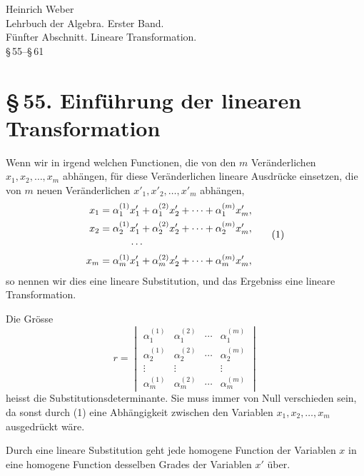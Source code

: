 \documentclass[11pt]{article}
\newcommand{\sect}[2]{\section*{\S\,#1. #2}}
\begin{document}
\begin{center}
{\large Heinrich Weber}\\[0.35em]
{\Large Lehrbuch der Algebra. Erster Band.}\\[0.35em]
{\large Fünfter Abschnitt. Lineare Transformation.}\\[0.25em]
{\large \S\,55--\S\,61}
\end{center}

\sect{55}{Einführung der linearen Transformation}

Wenn wir in irgend welchen Functionen, die von den $m$ Veränderlichen $x_1,x_2,\ldots,x_m$ abhängen, für diese Veränderlichen lineare Ausdrücke einsetzen, die von $m$ neuen Veränderlichen $x'_1,x'_2,\ldots,x'_m$ abhängen,
\begin{equation}
\begin{aligned}
 x_1&=\alpha_1^{(1)}x'_1+\alpha_1^{(2)}x'_2+\cdots+\alpha_1^{(m)}x'_m,\\
 x_2&=\alpha_2^{(1)}x'_1+\alpha_2^{(2)}x'_2+\cdots+\alpha_2^{(m)}x'_m,\\
 &\hspace{3.0em}\cdots\\
 x_m&=\alpha_m^{(1)}x'_1+\alpha_m^{(2)}x'_2+\cdots+\alpha_m^{(m)}x'_m,
\end{aligned}
\tag{1}
\end{equation}
so nennen wir dies eine lineare Substitution, und das Ergebniss eine lineare Transformation.

Die Grösse
\begin{equation}
 r=\begin{vmatrix}
 \alpha_1^{(1)}&\alpha_1^{(2)}&\cdots&\alpha_1^{(m)}\\
 \alpha_2^{(1)}&\alpha_2^{(2)}&\cdots&\alpha_2^{(m)}\\
 \vdots&\vdots&&\vdots\\
 \alpha_m^{(1)}&\alpha_m^{(2)}&\cdots&\alpha_m^{(m)}
 \end{vmatrix}
\tag{2}
\end{equation}
heisst die Substitutionsdeterminante. Sie muss immer von Null verschieden sein, da sonst durch (1) eine Abhängigkeit zwischen den Variablen $x_1,x_2,\ldots,x_m$ ausgedrückt wäre.

Durch eine lineare Substitution geht jede homogene Function der Variablen $x$ in eine homogene Function desselben Grades der Variablen $x'$ über.
\end{document}
